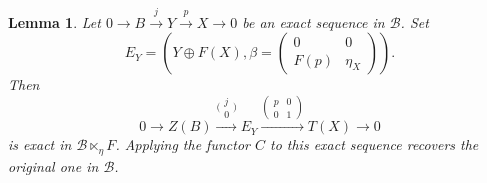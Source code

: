\documentclass[11pt,reqno]{amsart}
\numberwithin{equation}{section}
\newtheorem{lemma}[theorem]{Lemma}
\newcommand{\cB}{\mathcal B}
\begin{document}
\begin{lemma}\label{lem:E_Y-exact}
Let $0\rightarrow B\xrightarrow{j} Y \xrightarrow{p} X\rightarrow 0$ be an exact sequence in $\cB$. Set
\[
E_Y = \left(Y\oplus F(X), \beta=\begin{pmatrix}0 & 0\\ F(p) & \eta_X\end{pmatrix}\right).
\]
Then
\[
0\rightarrow Z(B)\xrightarrow{\big(\begin{smallmatrix}j\\ 0\end{smallmatrix}\big)} E_Y\xrightarrow{\left(\begin{smallmatrix}p & 0\\ 0 & 1\end{smallmatrix}\right)} T(X)\rightarrow 0
\]
is exact in $\cB\ltimes_\eta F$. Applying the functor $C$ to this exact sequence recovers the original one in $\cB$.
\end{lemma}
\end{document}
